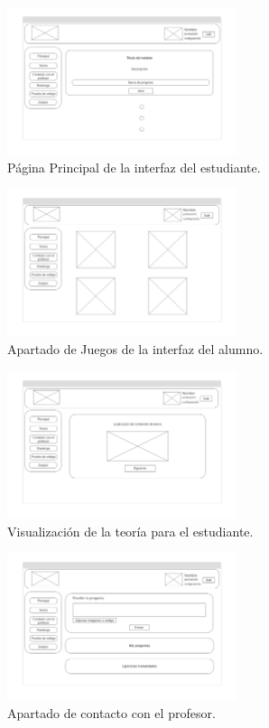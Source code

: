 \begin{figure}[H]
    \centering
    \includegraphics[width=0.6\textwidth]{imagenes/Mockups/3-Pag-Principal.png}
    \caption{Página Principal  de la interfaz del estudiante.}
\end{figure}

\begin{figure}[H]
    \centering
    \includegraphics[width=0.6\textwidth]{imagenes/Mockups/4-Juegos.png}
    \caption{Apartado de Juegos de la interfaz del alumno.}
\end{figure}

\begin{figure}[H]
    \centering
    \includegraphics[width=0.6\textwidth]{imagenes/Mockups/5-Teoria.png}
    \caption{Visualización de la teoría para el estudiante.}
\end{figure}

\begin{figure}[H]
    \centering
    \includegraphics[width=0.6\textwidth]{imagenes/Mockups/6-Consulta.png}
    \caption{Apartado de contacto con el profesor.}
\end{figure}

